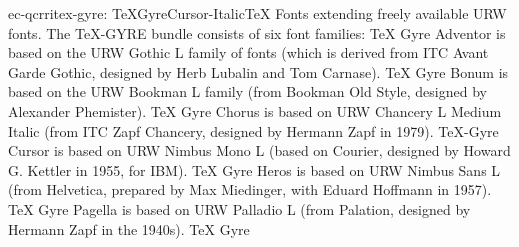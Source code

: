 \documentclass{ddltxtyp}
\begin{document}
\begin{package}{ec-qcrri}{tex-gyre: TeXGyreCursor-Italic}{{\TeX} Fonts extending freely available URW fonts.}
The {\TeX}-GYRE bundle consists of six font families: {\TeX} Gyre
Adventor is based on the URW Gothic L family of fonts (which is
derived from ITC Avant Garde Gothic, designed by Herb Lubalin
and Tom Carnase). {\TeX} Gyre Bonum is based on the URW Bookman L
family (from Bookman Old Style, designed by Alexander
Phemister). {\TeX} Gyre Chorus is based on URW Chancery L Medium
Italic (from ITC Zapf Chancery, designed by Hermann Zapf in
1979). {\TeX}-Gyre Cursor is based on URW Nimbus Mono L (based on
Courier, designed by Howard G. Kettler in 1955, for IBM). {\TeX}
Gyre Heros is based on URW Nimbus Sans L (from Helvetica,
prepared by Max Miedinger, with Eduard Hoffmann in 1957). {\TeX}
Gyre Pagella is based on URW Palladio L (from Palation,
designed by Hermann Zapf in the 1940s). {\TeX} Gyre %
\end{package}
\end{document}
